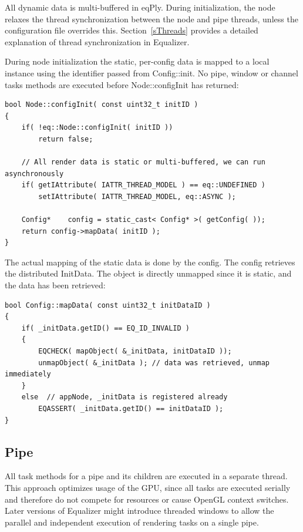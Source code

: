 \documentclass[10pt,a4]{scrartcl}
\newcommand{\sref}[1]{Section~\ref{#1}}
\begin{document}
All dynamic data is multi-buffered in \textsf{eqPly}. During
initialization, the node relaxes the thread synchronization between the
node and pipe threads, unless the configuration file overrides
this. \sref{sThreads} provides a detailed explanation of thread
synchronization in Equalizer.

During node initialization the static, per-config data is mapped to a
local instance using the identifier passed from
\textsf{Config::init}. No pipe, window or channel tasks methods are
executed before \textsf{Node::configInit} has returned:

{\footnotesize\begin{lstlisting}
bool Node::configInit( const uint32_t initID )
{
    if( !eq::Node::configInit( initID ))
        return false;

    // All render data is static or multi-buffered, we can run asynchronously
    if( getIAttribute( IATTR_THREAD_MODEL ) == eq::UNDEFINED )
        setIAttribute( IATTR_THREAD_MODEL, eq::ASYNC );

    Config*    config = static_cast< Config* >( getConfig( ));
    return config->mapData( initID );
}
\end{lstlisting}}

The actual mapping of the static data is done by the config. The config
retrieves the distributed \textsf{InitData}. The object is directly
unmapped since it is static, and the data has been retrieved:

{\footnotesize\begin{lstlisting}
bool Config::mapData( const uint32_t initDataID )
{
    if( _initData.getID() == EQ_ID_INVALID )
    {
        EQCHECK( mapObject( &_initData, initDataID ));
        unmapObject( &_initData ); // data was retrieved, unmap immediately
    }
    else  // appNode, _initData is registered already
        EQASSERT( _initData.getID() == initDataID );
}
\end{lstlisting}}

\subsection{Pipe}

All task methods for a pipe and its children are executed in a separate
thread. This approach optimizes usage of the GPU, since all
tasks are executed serially and therefore do not compete for resources
or cause OpenGL context switches. Later versions of Equalizer might
introduce threaded windows to allow the parallel and independent
execution of rendering tasks on a single pipe.
\end{document}
